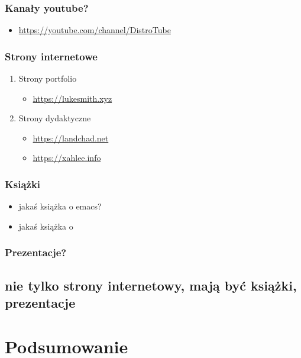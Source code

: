 \documentclass[11pt]{article}
\begin{document}
\subsubsection{Kanały youtube?}
\label{sec:orgcf6aaab}
\begin{itemize}
\item \url{https://youtube.com/channel/DistroTube}
\end{itemize}
\subsubsection{Strony internetowe}
\label{sec:org3ad41f8}
\begin{enumerate}
\item Strony portfolio
\label{sec:org8f2bfc4}
\begin{itemize}
\item \url{https://lukesmith.xyz}
\end{itemize}
\item Strony dydaktyczne
\label{sec:orgec41b09}
\begin{itemize}
\item \url{https://landchad.net}
\item \url{https://xahlee.info}
\end{itemize}
\end{enumerate}
\subsubsection{Książki}
\label{sec:orgc59a317}
\begin{itemize}
\item jakaś książka o emacs?
\item jakaś książka o
\end{itemize}
\subsubsection{Prezentacje?}
\label{sec:orgaaaf54b}
\subsection{nie tylko strony internetowy, mają być książki, prezentacje}
\label{sec:orgd2bc2da}
\section{Podsumowanie}
\label{sec:orgad7391f}
\end{document}
